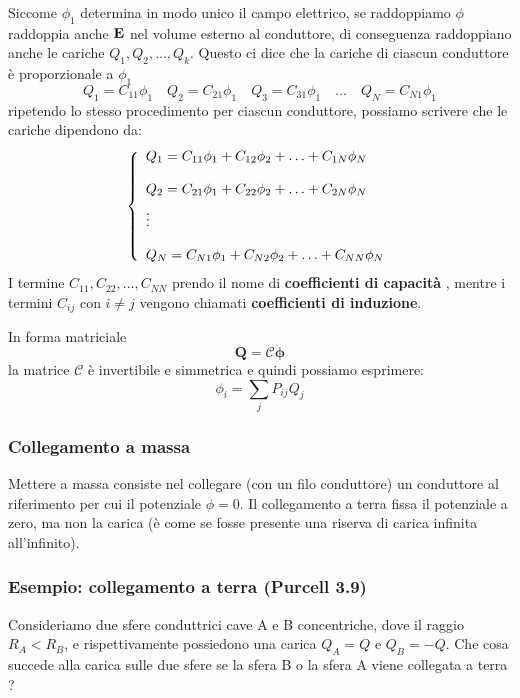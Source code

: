 Siccome $\phi_1$ determina in modo unico il campo elettrico, se raddoppiamo $\phi$ raddoppia anche $\bold{E}$ nel volume esterno al conduttore, di conseguenza raddoppiano anche le cariche $Q_1,Q_2,\ldots, Q_{k}$. Questo ci dice che la cariche di ciascun conduttore \`e proporzionale a $\phi_1$
\begin{equation*}
	Q_1 = C_{11}\phi_1 \quad Q_2 = C_{21}\phi_{1} \quad Q_3 = C_{31}\phi_{1} \quad \ldots \quad  Q_{N} = C_{N1}\phi_1
\end{equation*}
ripetendo lo stesso procedimento per ciascun conduttore, possiamo scrivere che le cariche dipendono da:
\begin{equation*}
	\left \{ \begin{array}{l}
		 Q_1 = C_{11} \phi_1 + C_{12}\phi_{2} + \ldots + C_{1N}\phi_{N} \\ \rule{0pt}{20pt}
		 Q_2 = C_{21} \phi_1 + C_{22} \phi_{2} + \ldots + C_{2N} \phi_N \\ \rule{0pt}{20pt}
		 \vdots \\ \rule{0pt}{20pt}
		 Q_{N} = C_{N1}\phi_{1} + C_{N2} \phi_2 + \ldots + C_{NN}\phi_{N}
	\end{array}\right.
\end{equation*}
I termine $C_{11},C_{22}, \ldots ,C_{NN}$ prendo il nome di \textbf{coefficienti di capacit\`a }, mentre i termini $C_{ij}$ con $i \neq j$ vengono chiamati \textbf{coefficienti di induzione}.

In forma matriciale 
\begin{equation*}
	\bm{Q} = \mathcal{C} \bm{\phi}
\end{equation*}
la matrice $\mathcal{C}$ \`e invertibile e simmetrica e quindi possiamo esprimere: 
\begin{equation*}
	\phi_{i} = \sum_{j}P_{ij}Q_{j}
\end{equation*}

\subsubsection{Collegamento a massa}

Mettere a massa consiste nel collegare (con un filo conduttore) un conduttore al riferimento per cui il potenziale $\phi = 0$. Il collegamento a terra fissa il potenziale a zero, ma non la carica (\`e  come se fosse presente una riserva di carica infinita all'infinito).
\newpage

\subsubsection{Esempio: collegamento a terra (Purcell 3.9)}
Consideriamo due sfere conduttrici cave A e B concentriche, dove il raggio $R_{A} < R_{B}$, e rispettivamente possiedono una carica $Q_{A} = Q$ e $Q_{B} = - Q$. Che cosa succede alla carica sulle due sfere  se la sfera B o la sfera A viene collegata a terra ?

